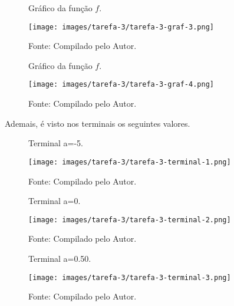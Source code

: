 \begin{figure}[H]
\centering
\caption{Gráfico da função $f$.}
\centering
\texttt{[image: images/tarefa-3/tarefa-3-graf-3.png]}
\caption*{Fonte: Compilado pelo Autor.}
\label{fig:tarefa 3 - Gráfico 3}
\end{figure}

\begin{figure}[H]
\centering
\caption{Gráfico da função $f$.}
\centering
\texttt{[image: images/tarefa-3/tarefa-3-graf-4.png]}
\caption*{Fonte: Compilado pelo Autor.}
\label{fig:tarefa 3 - Gráfico 4}
\end{figure}

\noindent
Ademais, é visto nos terminais os seguintes valores.

\begin{figure}[H]
\centering
\caption{Terminal a=-5.}
\centering
\texttt{[image: images/tarefa-3/tarefa-3-terminal-1.png]}
\caption*{Fonte: Compilado pelo Autor.}
\label{fig:tarefa 3 - Terminal 1}
\end{figure}

\begin{figure}[H]
\centering
\caption{Terminal a=0.}
\centering
\texttt{[image: images/tarefa-3/tarefa-3-terminal-2.png]}
\caption*{Fonte: Compilado pelo Autor.}
\label{fig:tarefa 3 - Terminal 2}
\end{figure}

\begin{figure}[H]
\centering
\caption{Terminal a=0.50.}
\centering
\texttt{[image: images/tarefa-3/tarefa-3-terminal-3.png]}
\caption*{Fonte: Compilado pelo Autor.}
\label{fig:tarefa 3 - Terminal 3}
\end{figure}
